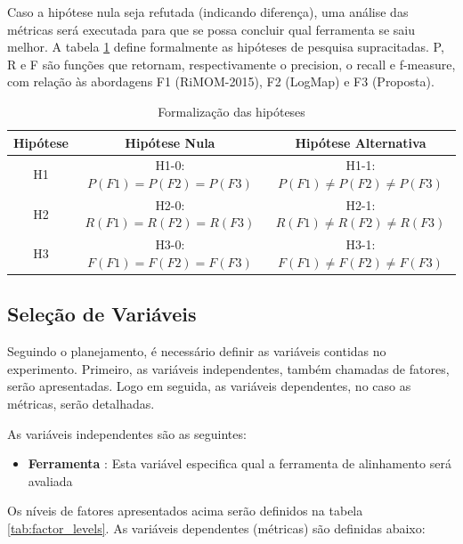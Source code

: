 Caso a hipótese nula seja refutada (indicando diferença), uma análise das métricas será executada para que se possa concluir qual ferramenta se saiu melhor.
A tabela \ref{tab:hypothesis} define formalmente as hipóteses de pesquisa supracitadas. P, R e F são funções que retornam, respectivamente o precision, o recall e f-measure, com relação às abordagens F1 (RiMOM-2015), F2 (LogMap) e F3 (Proposta).

\begin{table}[h]
\centering
\caption{Formalização das hipóteses}
\label{tab:hypothesis}
\begin{tabular}{|c|c|c|}
\hline
Hipótese & Hipótese Nula & Hipótese Alternativa \\ \hline
H1       & H1-0:$ P(F1) = P(F2) = P(F3) $ & H1-1:$ P(F1) \not= P(F2) \not= P(F3) $                    \\ \hline
H2       & H2-0:$ R(F1) = R(F2) = R(F3) $ & H2-1:$ R(F1) \not= R(F2) \not= R(F3) $                    \\ \hline
H3       & H3-0:$ F(F1) = F(F2) = F(F3) $ & H3-1:$ F(F1) \not= F(F2) \not= F(F3) $                    \\ \hline
\end{tabular}
\end{table}

\subsection{Seleção de Variáveis}
Seguindo o planejamento, é necessário definir as variáveis contidas no experimento. Primeiro, as variáveis independentes, também chamadas de fatores, serão apresentadas. Logo em seguida, as variáveis dependentes, no caso as métricas, serão detalhadas.

As variáveis independentes são as seguintes:
\begin{itemize}
\item \textbf{Ferramenta} : Esta variável especifica qual a ferramenta de alinhamento será avaliada
\end{itemize}

Os níveis de fatores apresentados acima serão definidos na tabela \ref{tab:factor_levels}. As variáveis dependentes (métricas) são definidas abaixo:

